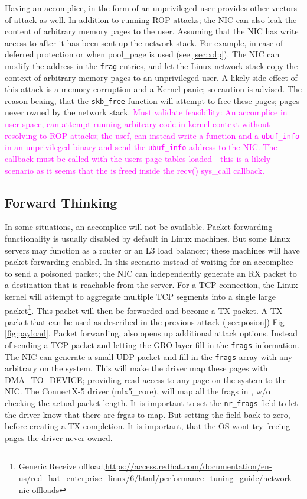 Having an accomplice, in the form of an unprivileged user provides other vectors of attack as well. In addition to running ROP attacks; the NIC can also leak the content of arbitrary memory pages to the user. Assuming that the NIC has write access to \shinfo after it has been sent up the network stack. For example, in case of deferred protection or when pool\_page is used (see \ref{sec:xdp}). The NIC can modify the \page address in the \texttt{frag} entries, and let the Linux network stack copy the context of arbitrary memory pages to an unprivileged user. A likely side effect of this attack is a memory corruption and a Kernel panic; so caution is advised. The reason beaing, that the \texttt{skb\_free} function will attempt to free these pages; pages never owned by the network stack.
\newline
\textcolor{magenta}{Must validate feasibility: An accomplice in user space, can attempt running arbitrary code in kernel context without resolving to ROP attacks; the usef, can instead write a function and a \texttt{ubuf\_info} in an unprivileged binary and send the \texttt{ubuf\_info} address to the NIC. The \shinfo callback must be called with the users page tables loaded - this is a likely scenario as it seems that the \skb is freed inside the recv() sys\_call callback.}

\subsection{Forward Thinking}
In some situations, an accomplice will not be available. Packet forwarding functionality is usually disabled by default in Linux machines. But some Linux servers may function as a router or an L3 load balancer; these machines will have packet forwarding enabled. In this scenario instead of waiting for an accomplice to send a poisoned packet; the NIC can independently generate an RX packet to a destination that is reachable from the server. For a TCP connection, the Linux kernel will attempt to aggregate multiple TCP segments into a single large packet\footnote{Generic Receive offload,\url{https://access.redhat.com/documentation/en-us/red_hat_enterprise_linux/6/html/performance_tuning_guide/network-nic-offloads}}. This packet will then be forwarded and become a TX packet. A TX packet that can be used as described in the previous attack (\ref{sec:posion}) Fig \ref{fig:payload}. \newline
Packet forwarding, also opens up additional attack options. Instead of sending a TCP packet and letting the GRO layer fill in the \texttt{frags} information. The NIC can generate a small UDP packet and fill in the \texttt{frags} array with any arbitrary \page on the system. This will make the driver map these pages with DMA\_TO\_DEVICE; providing read access to any page on the system to the NIC. The ConnectX-5 driver (mlx5\_core), will map all the frags in \shinfo, w/o checking the actual packet length. It is important to set the \texttt{nr\_frags} field to let the driver know that there are frgas to map. But setting the field back to zero, before creating a TX completion. It is important, that the OS wont try freeing pages the driver never owned.

